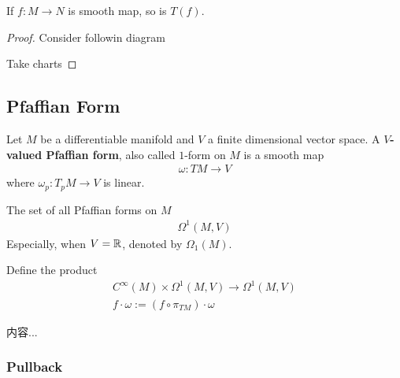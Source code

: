 \documentclass[Total.tex]{subfiles}
\begin{document}
			\begin{proposition}
				If $f:M\rightarrow N$ is smooth map, so is $T(f)$. 
			\end{proposition}
			\begin{proof}
				Consider followin diagram
				\begin{center}
				\end{center}
				
				Take charts 
			\end{proof}
			
			\subsection{Pfaffian Form}
			
			\begin{Def}
				Let $M$ be a differentiable manifold and $V$ a finite dimensional vector space. A \textbf{$V$-valued Pfaffian form}, also called $1$-form on $M$ is a smooth map
				\begin{gather*}
					\omega:TM\rightarrow V
				\end{gather*}
				where $\omega_p:T_p M\rightarrow V$ is linear. 
			\end{Def}
			
			The set of all Pfaffian forms on $M$
			\begin{gather*}
				\Omega^1(M,V)
			\end{gather*}
			Especially, when $V=\mathbb{R}$, denoted by $\Omega_1(M)$.
			
			\begin{Def}
				Define the product
				\begin{gather*}
					C^\infty(M)\times \Omega^1(M,V)\rightarrow \Omega^1(M,V)\\
					f\cdot \omega:=(f\circ \pi_{TM})\cdot \omega
				\end{gather*}
			\end{Def}
			
			\begin{example}
				内容...
			\end{example}
			
			\subsubsection{Pullback}
			
\end{document}
